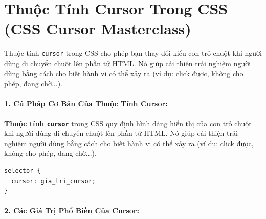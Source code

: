 \documentclass[11pt,oneside]{book}
\newcommand{\codeinline}[1]{\textcolor{accentOrange}{\texttt{#1}}}
\begin{document}
\section{Thuộc Tính Cursor Trong CSS (CSS Cursor Masterclass)}
\label{sec:css_cursor_masterclass}

Thuộc tính \codeinline{cursor} trong CSS cho phép bạn thay đổi kiểu con trỏ chuột khi người dùng di chuyển chuột lên phần tử HTML. Nó giúp cải thiện trải nghiệm người dùng bằng cách cho biết hành vi có thể xảy ra (ví dụ: click được, không cho phép, đang chờ...).

\paragraph{1. Cú Pháp Cơ Bản Của Thuộc Tính Cursor:}

\begin{conceptBox}
\textbf{Thuộc tính \codeinline{cursor}} trong CSS quy định hình dáng hiển thị của con trỏ chuột khi người dùng di chuyển chuột lên phần tử HTML. Nó giúp cải thiện trải nghiệm người dùng bằng cách cho biết hành vi có thể xảy ra (ví dụ: click được, không cho phép, đang chờ...).
\end{conceptBox}

\begin{codeWindow}
\begin{lstlisting}[language=CSS3]
selector {
  cursor: gia_tri_cursor;
}
\end{lstlisting}
\end{codeWindow}

\paragraph{2. Các Giá Trị Phổ Biến Của Cursor:}
\end{document}
